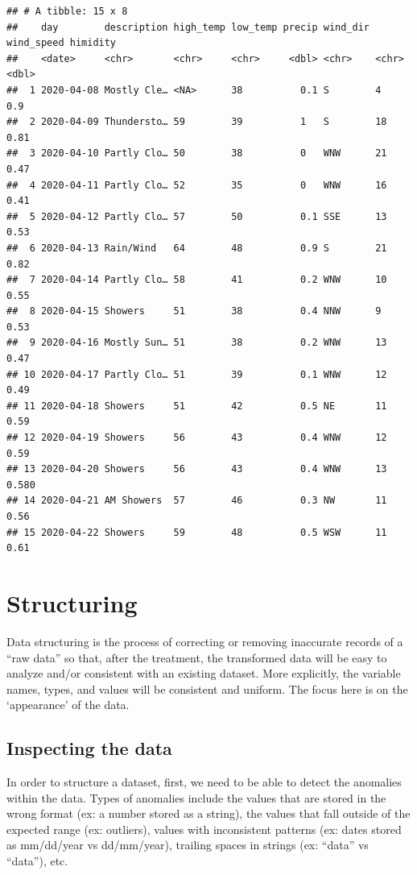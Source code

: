 \documentclass[
]{book}
\begin{document}
\begin{verbatim}
## # A tibble: 15 x 8
##    day        description high_temp low_temp precip wind_dir wind_speed himidity
##    <date>     <chr>       <chr>     <chr>     <dbl> <chr>    <chr>         <dbl>
##  1 2020-04-08 Mostly Cle… <NA>      38          0.1 S        4             0.9  
##  2 2020-04-09 Thundersto… 59        39          1   S        18            0.81 
##  3 2020-04-10 Partly Clo… 50        38          0   WNW      21            0.47 
##  4 2020-04-11 Partly Clo… 52        35          0   WNW      16            0.41 
##  5 2020-04-12 Partly Clo… 57        50          0.1 SSE      13            0.53 
##  6 2020-04-13 Rain/Wind   64        48          0.9 S        21            0.82 
##  7 2020-04-14 Partly Clo… 58        41          0.2 WNW      10            0.55 
##  8 2020-04-15 Showers     51        38          0.4 NNW      9             0.53 
##  9 2020-04-16 Mostly Sun… 51        38          0.2 WNW      13            0.47 
## 10 2020-04-17 Partly Clo… 51        39          0.1 WNW      12            0.49 
## 11 2020-04-18 Showers     51        42          0.5 NE       11            0.59 
## 12 2020-04-19 Showers     56        43          0.4 WNW      12            0.59 
## 13 2020-04-20 Showers     56        43          0.4 WNW      13            0.580
## 14 2020-04-21 AM Showers  57        46          0.3 NW       11            0.56 
## 15 2020-04-22 Showers     59        48          0.5 WSW      11            0.61
\end{verbatim}

\hypertarget{structuring}{%
\chapter{Structuring}\label{structuring}}

Data structuring is the process of correcting or removing inaccurate records of a ``raw data'' so that, after the treatment, the transformed data will be easy to analyze and/or consistent with an existing dataset. More explicitly, the variable names, types, and values will be consistent and uniform. The focus here is on the `appearance' of the data.

\hypertarget{inspecting-the-data}{%
\section{Inspecting the data}\label{inspecting-the-data}}

In order to structure a dataset, first, we need to be able to detect the anomalies within the data. Types of anomalies include the values that are stored in the wrong format (ex: a number stored as a string), the values that fall outside of the expected range (ex: outliers), values with inconsistent patterns (ex: dates stored as mm/dd/year vs dd/mm/year), trailing spaces in strings (ex: ``data'' vs ``data''), etc.
\end{document}

